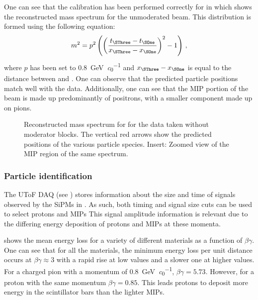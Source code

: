 One can see that the calibration has been performed correctly for \SThree in  which shows the reconstructed mass spectrum for the unmoderated beam.
This distribution is formed using the following equation:
\begin{equation}
  m^{2} = p^{2} \left( \left( \frac{t_{\SThree} - t_{\SOne}}{x_{\SThree} - x_{\SOne}} \right)^{2} - 1 \right) \, ,
  \label{eq:massDistribution}
\end{equation}
where $p$ has been set to \SI{0.8}{\giga\electronvolt\per\clight} and $x_{\SThree} - x_{\SOne}$ is equal to the distance between \SOne and \SThree.
One can observe that the predicted particle positions match well with the data.
Additionally, one can see that the MIP portion of the beam is made up predominantly of positrons, with a smaller component made up on pions.

\begin{figure}[h]
  \begin{adjustbox}{max totalsize=\textwidth, center}
    
  \end{adjustbox}
  \caption[Reconstructed mass spectrum for \SThree]{Reconstructed mass spectrum for \SThree for the data taken without moderator blocks. The vertical red arrows show the predicted positions of the various particle species. Insert: Zoomed view of the MIP region of the same spectrum.}
  \label{fig:s3MassDistribution}
\end{figure}

\subsubsection{Particle identification}
\label{sec:hptpc_beam_flux:methods:s3:pid}

The UToF DAQ (see ) stores information about the size and time of signals observed by the SiPMs in \SThree.
As such, both timing and signal size cuts can be used to select protons and MIPs
This signal amplitude information is relevant due to the differing energy deposition of protons and MIPs at these momenta.

 shows the mean energy loss for a variety of different materials as a function of $\beta \gamma$.
One can see that for all the materials, the minimum energy loss per unit distance occurs at $\beta\gamma \approx 3$ with a rapid rise at low values and a slower one at higher values.
For a charged pion with a momentum of \SI{0.8}{\giga\electronvolt\per\clight}, $\beta\gamma = 5.73$.
However, for a proton with the same momentum $\beta\gamma = 0.85$.
This leads protons to deposit more energy in the scintillator bars than the lighter MIPs.

